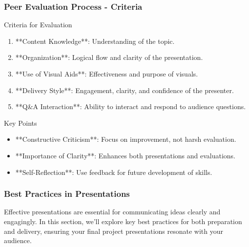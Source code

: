 \documentclass[aspectratio=169]{beamer}
\begin{document}
\begin{frame}[fragile]
  \frametitle{Peer Evaluation Process - Criteria}
  \begin{block}{Criteria for Evaluation}
    \begin{enumerate}
      \item **Content Knowledge**: Understanding of the topic.
      \item **Organization**: Logical flow and clarity of the presentation.
      \item **Use of Visual Aids**: Effectiveness and purpose of visuals.
      \item **Delivery Style**: Engagement, clarity, and confidence of the presenter.
      \item **Q\&A Interaction**: Ability to interact and respond to audience questions.
    \end{enumerate}
  \end{block}

  \begin{block}{Key Points}
    \begin{itemize}
      \item **Constructive Criticism**: Focus on improvement, not harsh evaluation.
      \item **Importance of Clarity**: Enhances both presentations and evaluations.
      \item **Self-Reflection**: Use feedback for future development of skills.
    \end{itemize}
  \end{block}
\end{frame}

\begin{frame}[fragile]
    \frametitle{Best Practices in Presentations}
    Effective presentations are essential for communicating ideas clearly and engagingly. 
    In this section, we'll explore key best practices for both preparation and delivery, ensuring your final project presentations resonate with your audience.
\end{frame}
\end{document}
